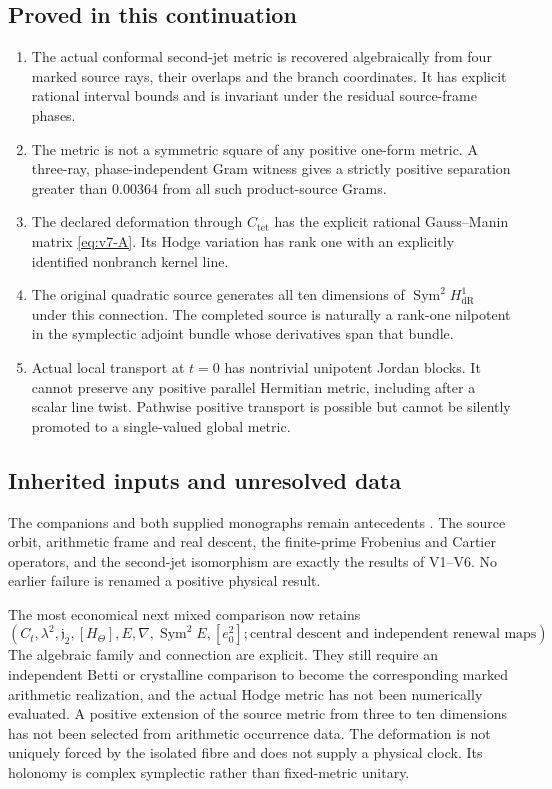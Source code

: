 \documentclass[11pt]{article}
\theoremstyle{definition}
\theoremstyle{remark}
\begin{document}
\subsection{Proved in this continuation}
\begin{enumerate}[label=\textup{(P7.\arabic*)},leftmargin=3.6em]
\item The actual conformal second-jet metric is recovered algebraically from
      four marked source rays, their overlaps and the branch coordinates.
      It has explicit rational interval bounds and is invariant under the
      residual source-frame phases.
\item The metric is not a symmetric square of any positive one-form metric.
      A three-ray, phase-independent Gram witness gives a strictly positive
      separation greater than $0.00364$ from all such product-source Grams.
\item The declared deformation through $C_{\mathrm{tet}}$ has the explicit
      rational Gauss--Manin matrix \eqref{eq:v7-A}. Its Hodge variation has
      rank one with an explicitly identified nonbranch kernel line.
\item The original quadratic source generates all ten dimensions of
      $\operatorname{Sym}^2H^1_{\mathrm{dR}}$ under this connection. The
      completed source is naturally a rank-one nilpotent in the symplectic
      adjoint bundle whose derivatives span that bundle.
\item Actual local transport at $t=0$ has nontrivial unipotent Jordan blocks.
      It cannot preserve any positive parallel Hermitian metric, including
      after a scalar line twist. Pathwise positive transport is possible
      but cannot be silently promoted to a single-valued global metric.
\end{enumerate}

\subsection{Inherited inputs and unresolved data}
The companions and both supplied monographs remain antecedents
\cite{GT77,Arithmetic,Spacetime,Spectral,Duality,Variational}. The source
orbit, arithmetic frame and real descent, the finite-prime Frobenius and
Cartier operators, and the second-jet isomorphism are exactly the results of
V1--V6. No earlier failure is renamed a positive physical result.

The most economical next mixed comparison now retains
\[
 \boxed{
 (C_t,\lambda^2,\mathfrak j_2,[H_\Theta],
       E,\nabla,\operatorname{Sym}^2E,[e_0^2];
       \text{central descent and independent renewal maps}).}
\]
The algebraic family and connection are explicit. They still require an
independent Betti or crystalline comparison to become the corresponding
marked arithmetic realization, and the actual Hodge metric has not been
numerically evaluated. A positive extension of the source metric from three
to ten dimensions has not been selected from arithmetic occurrence data.
The deformation is not uniquely forced by the isolated fibre and does not
supply a physical clock. Its holonomy is complex symplectic rather than
fixed-metric unitary.
\end{document}
